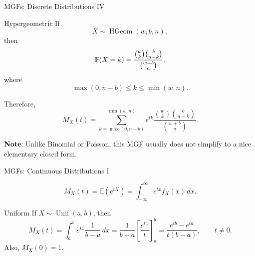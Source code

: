 \begin{frame}{MGFs: Discrete Distributions IV}

\small

\begin{keybox}{Hypergeometric}
If
\[
X\sim\operatorname{HGeom}(w,b,n),
\]
then
\[
\mathbb{P}(X=k)=
\frac{\binom{w}{k}\binom{b}{n-k}}{\binom{w+b}{n}},
\]
where
\[
\max(0,n-b)\le k\le \min(w,n).
\]

Therefore,
\[
M_X(t)
=
\sum_{k=\max(0,n-b)}^{\min(w,n)}
e^{tk}
\frac{\binom{w}{k}\binom{b}{n-k}}{\binom{w+b}{n}}.
\]
\end{keybox}

\textbf{Note}: Unlike Binomial or Poisson, this MGF usually does not simplify to a nice elementary closed form.

\end{frame}




\begin{frame}{MGFs: Continuous Distributions I}

\small

\[
M_X(t)=\mathbb{E}(e^{tX})=\int_{-\infty}^{\infty} e^{tx}f_X(x)\,dx.
\]

\begin{keybox}{Uniform}
If \(X\sim\operatorname{Unif}(a,b)\), then
\[
M_X(t)=\int_a^b e^{tx}\frac1{b-a}\,dx
=\frac1{b-a}\left[\frac{e^{tx}}{t}\right]_a^b
=\frac{e^{tb}-e^{ta}}{t(b-a)},
\qquad t\ne0.
\]
Also, \(M_X(0)=1\).
\end{keybox}

\end{frame}







